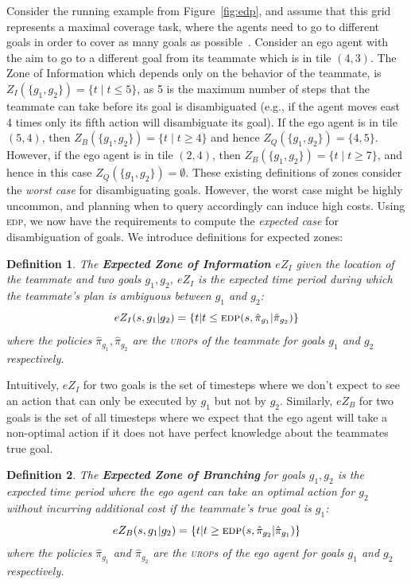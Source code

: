 \documentclass[letterpaper]{article}
\newtheorem{definition}{Definition}
\begin{document}
\noindent  Consider the running example from Figure~\ref{fig:edp}, and assume that this grid represents a maximal coverage task, where the agents need to go to different goals in order to cover as many goals as possible~\cite{pita2008deployed}. Consider an ego agent with the aim to go to a different goal from its teammate which is in tile $(4,3)$. The Zone of Information which depends only on the behavior of the teammate, is $Z_I(\{g_1,g_2\})=\{t \mid t \leq 5\}$, as 5 is the maximum number of steps that the teammate can take before its goal is disambiguated (e.g., if the agent moves east 4 times only its fifth action will disambiguate its goal). If the ego agent is in tile $(5,4)$, then $Z_B(\{g_1,g_2\})=\{t \mid t \geq 4\}$ and hence $Z_Q(\{g_1,g_2\})=\{4,5\}$. However, if the ego agent is in tile $(2,4)$, then $Z_B(\{g_1,g_2\})=\{t \mid t \geq 7\}$, and hence in this case $Z_Q(\{g_1,g_2\})=\emptyset$.
These existing definitions of zones consider the \emph{worst case} for disambiguating goals. However, the worst case might be highly uncommon, and planning when to query accordingly can induce high costs.
Using \textsc{edp}, we now have the requirements to compute the \emph{expected case} for disambiguation of goals. We introduce definitions for expected zones: %
\begin{definition}
The \textbf{Expected Zone of Information $eZ_I$} given the location of the teammate and two goals $g_1, g_2$, $eZ_I$ is the expected time period during which the teammate's plan is ambiguous between $g_1$ and $g_2$:
\begin{equation*}
eZ_I(s, g_1 | g_2) = \{t| t \leq \textsc{edp}(s, \hat{\pi}_{g_1} | \hat{\pi}_{g_2})\}
\end{equation*}
where the policies $\hat{\pi}_{g_1},\hat{\pi}_{g_2}$ are the \textsc{urop}s of the teammate for goals $g_1$ and $g_2$ respectively.

\end{definition}

\noindent Intuitively, $eZ_I$ for two goals is the set of timesteps where we don't expect to see an action that can only be executed by $g_1$ but not by $g_2$. Similarly, $eZ_B$ for two goals is the set of all timesteps where we expect that the ego agent will take a non-optimal action if it does not have perfect knowledge about the teammates true goal.

\begin{definition}
The \textbf{Expected Zone of Branching} for goals $g_1, g_2$ is the expected time period where the ego agent can take an optimal action for $g_2$ without incurring additional cost if the teammate's true goal is $g_1$:
\begin{equation*}
eZ_B(s, g_1 | g_2) = \{t | t \geq \textsc{edp}(s, \hat{\pi}_{g_2} | \hat{\pi}_{g_1})\}
\end{equation*}
where the policies $\hat{\pi}_{g_1}$ and $\hat{\pi}_{g_2}$ are the \textsc{urop}s of the \emph{ego agent} for goals $g_1$ and $g_2$ respectively.%
\end{definition}
\end{document}

